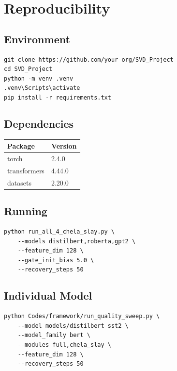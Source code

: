 \section{Reproducibility}

\subsection{Environment}

\begin{lstlisting}
git clone https://github.com/your-org/SVD_Project
cd SVD_Project
python -m venv .venv
.venv\Scripts\activate
pip install -r requirements.txt
\end{lstlisting}

\subsection{Dependencies}

\begin{table}[H]
\centering
\small
\begin{tabular}{ll}
\toprule
\textbf{Package} & \textbf{Version} \\
\midrule
torch & 2.4.0 \\
transformers & 4.44.0 \\
datasets & 2.20.0 \\
\bottomrule
\end{tabular}
\end{table}

\subsection{Running}

\begin{lstlisting}
python run_all_4_chela_slay.py \
    --models distilbert,roberta,gpt2 \
    --feature_dim 128 \
    --gate_init_bias 5.0 \
    --recovery_steps 50
\end{lstlisting}

\subsection{Individual Model}

\begin{lstlisting}
python Codes/framework/run_quality_sweep.py \
    --model models/distilbert_sst2 \
    --model_family bert \
    --modules full,chela_slay \
    --feature_dim 128 \
    --recovery_steps 50
\end{lstlisting}

